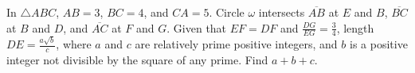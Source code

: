 In $ \triangle ABC $,  $ AB = 3 $,  $ BC = 4 $,  and $ CA = 5 $. Circle $\omega$ intersects $\overline{AB}$ at $E$ and $B$,  $\overline{BC}$ at $B$ and $D$,  and $\overline{AC}$ at $F$ and $G$. Given that $EF=DF$ and $\tfrac{DG}{EG} = \tfrac{3}{4}$,  length $DE=\tfrac{a\sqrt{b}}{c}$,  where $a$ and $c$ are relatively prime positive integers, and $b$ is a positive integer not divisible by the square of any prime. Find $a+b+c$.